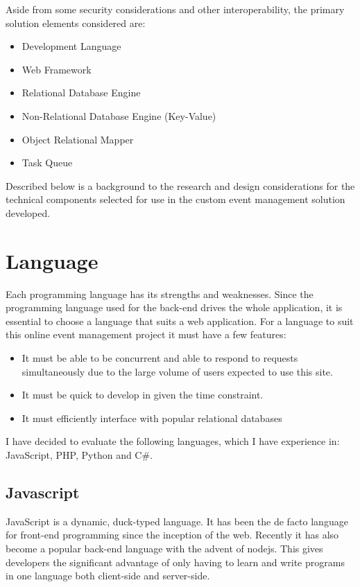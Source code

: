 \documentclass[a4paper,oneside,12pt]{report}
\begin{document}
	Aside from some security considerations and other interoperability, the primary solution elements considered are:
	\begin{itemize}
		\item Development Language
		\item Web Framework
		\item Relational Database Engine
		\item Non-Relational Database Engine (Key-Value)
		\item Object Relational Mapper
		\item Task Queue
	\end{itemize}
	Described below is a background to the research and design considerations for the technical components selected for use in the custom event management solution developed.

	\section{Language}
	Each programming language has its strengths and weaknesses. Since the programming language used for the back-end drives the whole application, it is essential to choose a language that suits a web application. For a language to suit this online event management project it must have a few features:

	\begin{itemize}
		\item It must be able to be concurrent and able to respond to requests simultaneously due to the large volume of users expected to use this site.
		\item It must be quick to develop in given the time constraint.
		\item It must efficiently interface with popular relational databases
	\end{itemize}

	I have decided to evaluate the following languages, which I have experience in: JavaScript, PHP, Python and C\#.

	\subsection{Javascript}
	JavaScript is a dynamic, duck-typed language. It has been the de facto language for front-end programming since the inception of the web. Recently it has also become a popular back-end language with the advent of nodejs. This gives developers the significant advantage of only having to learn and write programs in one language both client-side and server-side.
\end{document}
